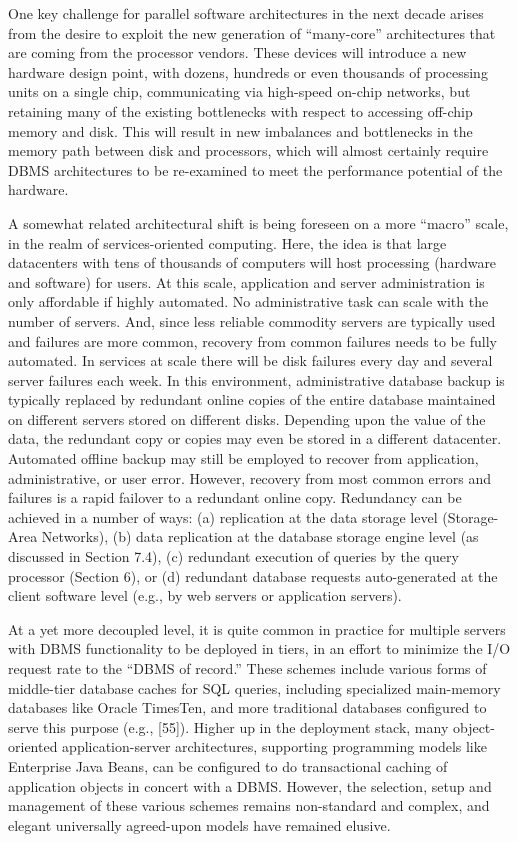 \documentclass[a4paper,11pt,twoside,openright]{book}
\begin{document}
One key challenge for parallel software architectures in the next decade
arises from the desire to exploit the new generation of ``many-core''
architectures that are coming from the processor vendors. These devices
will introduce a new hardware design point, with dozens, hundreds or
even thousands of processing units on a single chip, communicating via
high-speed on-chip networks, but retaining many of the existing
bottlenecks with respect to accessing off-chip memory and disk. This
will result in new imbalances and bottlenecks in the memory path between
disk and processors, which will almost certainly require DBMS
architectures to be re-examined to meet the performance potential of the
hardware.

A somewhat related architectural shift is being foreseen on a more
``macro'' scale, in the realm of services-oriented computing. Here, the
idea is that large datacenters with tens of thousands of computers will
host processing (hardware and software) for users. At this scale,
application and server administration is only affordable if highly
automated. No administrative task can scale with the number of servers.
And, since less reliable commodity servers are typically used and
failures are more common, recovery from common failures needs to be
fully automated. In services at scale there will be disk failures every
day and several server failures each week. In this environment,
administrative database backup is typically replaced by redundant online
copies of the entire database maintained on different servers stored on
different disks. Depending upon the value of the data, the redundant
copy or copies may even be stored in a different datacenter. Automated
offline backup may still be employed to recover from application,
administrative, or user error. However, recovery from most common errors
and failures is a rapid failover to a redundant online copy. Redundancy
can be achieved in a number of ways: (a) replication at the data storage
level (Storage-Area Networks), (b) data replication at the database
storage engine level (as discussed in Section 7.4), (c) redundant
execution of queries by the query processor (Section 6), or (d)
redundant database requests auto-generated at the client software level
(e.g., by web servers or application servers).

At a yet more decoupled level, it is quite common in practice for
multiple servers with DBMS functionality to be deployed in tiers, in an
effort to minimize the I/O request rate to the ``DBMS of record.'' These
schemes include various forms of middle-tier database caches for SQL
queries, including specialized main-memory databases like Oracle
TimesTen, and more traditional databases configured to serve this
purpose (e.g., {[}55{]}). Higher up in the deployment stack, many
object-oriented application-server architectures, supporting programming
models like Enterprise Java Beans, can be configured to do transactional
caching of application objects in concert with a DBMS. However, the
selection, setup and management of these various schemes remains
non-standard and complex, and elegant universally agreed-upon models
have remained elusive.
\end{document}
